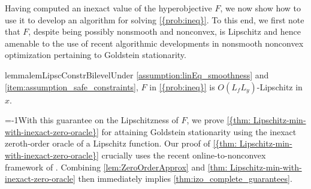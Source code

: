 Having computed an inexact value of the  hyperobjective $F$, we now show how to use it to develop an algorithm for solving  \cref{{prob:ineq}}. To this end, we first note that  $F$, despite being 
 possibly nonsmooth and nonconvex, is Lipschitz and hence amenable to the use of recent algorithmic developments  in nonsmooth nonconvex optimization pertaining to Goldstein stationarity. 
\begin{restatable}{lemma}{lemLipscConstrBilevel}\label{lem:LipscConstrBilevel}Under \cref{assumption:linEq_smoothness} and \ref{item:assumption_safe_constraints}, $F$ in  \cref{{prob:ineq}} is $O(L_fL_y)$-Lipschitz in $x$.
\end{restatable}

\looseness=-1With this guarantee on the Lipschitzness of $F$, we prove \cref{{thm: Lipschitz-min-with-inexact-zero-oracle}} for attaining Goldstein stationarity using the inexact zeroth-order oracle of a Lipschitz function. Our proof of \cref{{thm: Lipschitz-min-with-inexact-zero-oracle}} crucially uses the recent online-to-nonconvex framework of \citet{cutkosky2023optimal}. Combining \cref{lem:ZeroOrderApprox} and \cref{thm: Lipschitz-min-with-inexact-zero-oracle} then immediately implies \cref{thm:izo_complete_guarantees}. 



